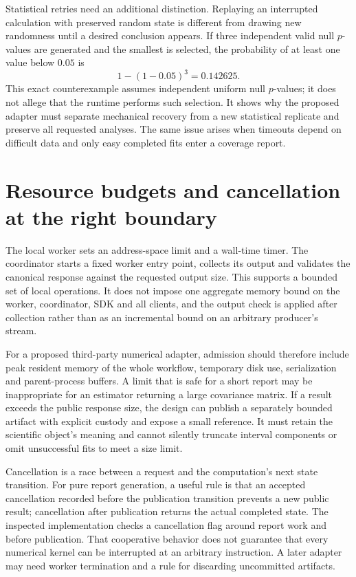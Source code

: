 Statistical retries need an additional distinction. Replaying an interrupted
calculation with preserved random state is different from drawing new
randomness until a desired conclusion appears. If three independent valid
null $p$-values are generated and the smallest is selected, the probability
of at least one value below $0.05$ is
\[
 1-(1-0.05)^3=0.142625.
\]
This exact counterexample assumes independent uniform null $p$-values;
it does not allege that the runtime performs such selection. It shows why
the proposed adapter must separate mechanical recovery from a new statistical
replicate and preserve all requested analyses. The same issue arises when
timeouts depend on difficult data and only easy completed fits enter a
coverage report\cite{exec13_ops_exact}.

\section{Resource budgets and cancellation at the right boundary}

The local worker sets an address-space limit and a wall-time timer. The
coordinator starts a fixed worker entry point, collects its output and
validates the canonical response against the requested output size. This
supports a bounded set of local operations. It does not impose one aggregate
memory bound on the worker, coordinator, SDK and all clients, and the output
check is applied after collection rather than as an incremental bound on an
arbitrary producer's stream\cite{exec13_ops_source}.

For a proposed third-party numerical adapter, admission should therefore
include peak resident memory of the whole workflow, temporary disk use,
serialization and parent-process buffers. A limit that is safe for a short
report may be inappropriate for an estimator returning a large covariance
matrix. If a result exceeds the public response size, the design can publish
a separately bounded artifact with explicit custody and expose a small
reference. It must retain the scientific object's meaning and cannot silently
truncate interval components or omit unsuccessful fits to meet a size limit.

Cancellation is a race between a request and the computation's next state
transition. For pure report generation, a useful rule is that an accepted
cancellation recorded before the publication transition prevents a new public
result; cancellation after
publication returns the actual completed state. The inspected implementation
checks a cancellation flag around report work and before publication. That
cooperative behavior does not guarantee that every numerical kernel can be
interrupted at an arbitrary instruction. A later adapter may need worker
termination and a rule for discarding uncommitted artifacts.

